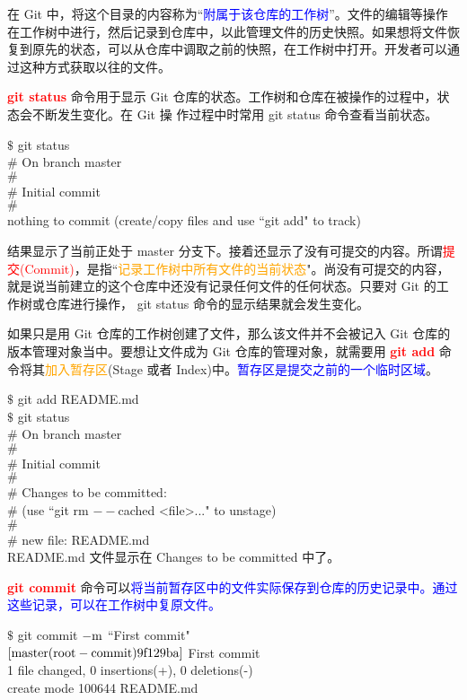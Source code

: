 \documentclass[12pt,a4paper]{article}
\begin{document}
在 Git 中，将这个目录的内容称为``\textcolor{blue}{附属于该仓库的工作树}”。文件的编辑等操作在工作树中进行，然后记录到仓库中，以此管理文件的历史快照。如果想将文件恢复到原先的状态，可以从仓库中调取之前的快照，在工作树中打开。开发者可以通过这种方式获取以往的文件。

 \textcolor{red}{\bf git status} 命令用于显示 Git 仓库的状态。工作树和仓库在被操作的过程中，状态会不断发生变化。在 Git 操
作过程中时常用 git status 命令查看当前状态。

$\$$ git status \\
$\#$ On branch master \\
$\#$  \\
$\#$  Initial commit \\
$\#$  \\
nothing to commit (create/copy files and use ``git add" to track) 

结果显示了当前正处于 master 分支下。接着还显示了没有可提交的内容。所谓\textcolor{red}{提交(Commit)}，是指``\textcolor{orange}{记录工作树中所有文件的当前状态}"。尚没有可提交的内容，就是说当前建立的这个仓库中还没有记录任何文件的任何状态。只要对 Git 的工作树或仓库进行操作， git status 命令的显示结果就会发生变化。

如果只是用 Git 仓库的工作树创建了文件，那么该文件并不会被记入 Git 仓库的版本管理对象当中。要想让文件成为 Git 仓库的管理对象，就需要用 \textcolor{red}{\bf git add} 命令将其\textcolor{orange}{加入暂存区}(Stage 或者 Index)中。\textcolor{blue}{暂存区是提交之前的一个临时区域}。

$\$$ git add README.md \\
$\$$ git status \\
$\#$ On branch master \\
$\#$ \\
$\#$ Initial commit \\
$\#$ \\
$\#$ Changes to be committed: \\
$\#$ (use ``git rm $--$cached <file>..." to unstage) \\
$\#$ \\
$\#$ new file: README.md \\

README.md 文件显示在 Changes to be committed 中了。

\textcolor{red}{\bf git commit }命令可以\textcolor{blue}{将当前暂存区中的文件实际保存到仓库的历史记录中。通过这些记录，可以在工作树中复原文件。}

$\$$ git commit $\rm -m$ ``First commit" \\
$\rm [master (root-commit) 9f129ba]$ First commit \\
1 file changed, 0 insertions(+), 0 deletions(-) \\
create mode 100644 README.md 
\end{document}
